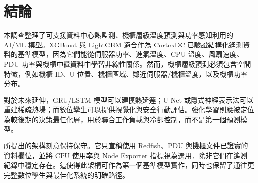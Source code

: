 \documentclass[12pt,a4paper]{article}
\begin{document}
\section{結論}

本調查整理了可支援資料中心熱監測、機櫃層級溫度預測與功率感知利用的 AI/ML 模型。XGBoost 與 LightGBM 適合作為 CortexDC 已驗證結構化遙測資料的基準模型，因為它們能從伺服器功率、進氣溫度、CPU 溫度、風扇速度、PDU 功率與機櫃中繼資料中學習非線性關係。然而，機櫃層級預測必須包含空間特徵，例如機櫃 ID、U 位置、機櫃區域、鄰近伺服器/機櫃溫度，以及機櫃功率分布。

對於未來延伸，GRU/LSTM 模型可以建模熱延遲；U-Net 或隱式神經表示法可以重建稀疏熱場；而數位孿生可以提供視覺化與安全行動評估。強化學習則應被定位為較後期的決策最佳化層，用於聯合工作負載與冷卻控制，而不是第一個預測模型。

所提出的架構刻意保持保守。它只宣稱使用 Redfish、PDU 與機櫃文件已證實的資料欄位，並將 CPU 使用率與 Node Exporter 指標視為選用，除非它們在遙測紀錄中穩定存在。這使得此架構可作為第一個基準模型實作，同時也保留了通往更完整數位孿生與最佳化系統的明確路徑。
\end{document}
